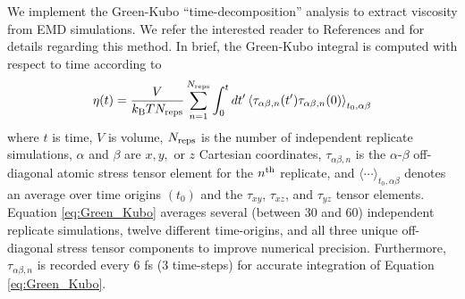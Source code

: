 \documentclass[preprint,review,12pt]{elsarticle}
\begin{document}
	We implement the Green-Kubo ``time-decomposition'' analysis to extract viscosity from EMD simulations. We refer the interested reader to References  and  for details regarding this method. In brief, the Green-Kubo integral is computed with respect to time according to
	\begin{equation} \label{eq:Green_Kubo}
	\eta(t) = \frac{V}{k_{\rm B} T N_{\rm reps}} \sum_{n=1}^{N_{\rm reps}} \int_{0}^{t}dt'\left\langle \tau_{\alpha\beta,n}(t') \tau_{\alpha\beta,n}(0)\right\rangle_{t_0,\alpha\beta}
	\end{equation} 
	where $t$ is time, $V$ is volume, $N_{\rm reps}$ is the number of independent replicate simulations, $\alpha$ and $\beta$ are $x, y, $ or $z$ Cartesian coordinates, $\tau_{\alpha\beta,n}$ is the $\alpha$-$\beta$ off-diagonal atomic stress tensor element for the $n^{\rm th}$ replicate, and $\langle \cdots \rangle_{t_0,\alpha\beta}$ denotes an average over time origins $(t_0)$ and the $\tau_{xy}$, $\tau_{xz}$, and $\tau_{yz}$ tensor elements. Equation \ref{eq:Green_Kubo} averages several (between 30 and 60) independent replicate simulations, twelve different time-origins, and all three unique off-diagonal stress tensor components to improve numerical precision. Furthermore, $\tau_{\alpha\beta,n}$ is recorded every 6 fs (3 time-steps) for accurate integration of Equation \ref{eq:Green_Kubo}.

%	
	
\end{document}
